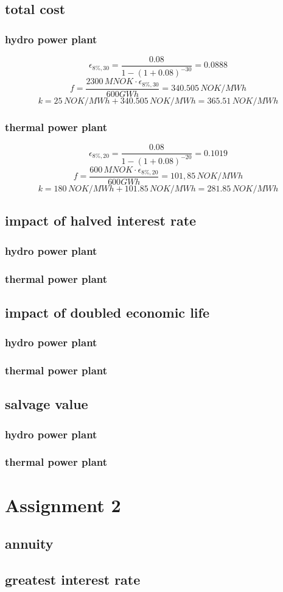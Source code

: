 \documentclass{article}
\begin{document}
\subsection{total cost}
\subsubsection{hydro power plant}
$$\epsilon_{8\%,30}=\frac{0.08}{1-(1+0.08)^{-30}}=0.0888$$
$$f=\frac{2300\,MNOK\cdot\epsilon_{8\%,30}}{600GWh}=340.505\,NOK/MWh$$
$$k=25\,NOK/MWh+340.505\,NOK/MWh=365.51\,NOK/MWh$$
\subsubsection{thermal power plant}
$$\epsilon_{8\%,20}=\frac{0.08}{1-(1+0.08)^{-20}}=0.1019$$
$$f=\frac{600\,MNOK\cdot\epsilon_{8\%,20}}{600GWh}=101,85\,NOK/MWh$$
$$k=180\,NOK/MWh+101.85\,NOK/MWh=281.85\,NOK/MWh$$
\subsection{impact of halved interest rate}
\subsubsection{hydro power plant}
\subsubsection{thermal power plant}
\subsection{impact of doubled economic life}
\subsubsection{hydro power plant}
\subsubsection{thermal power plant}
\subsection{salvage value}
\subsubsection{hydro power plant}
\subsubsection{thermal power plant}
\section{Assignment 2}
\subsection{annuity}
\subsection{greatest interest rate}
\end{document}
